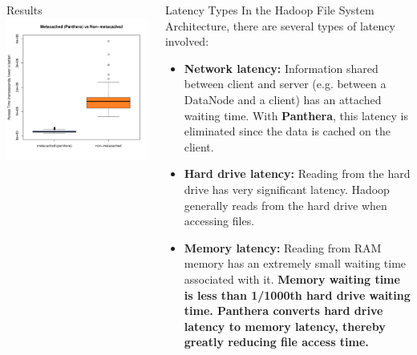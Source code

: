 \documentclass[final]{beamer} %
\begin{document}
\begin{frame}
\begin{columns}[t]
\begin{column}{0.32\textwidth}
\begin{block}{Results}
		\vspace{1em}
		\includegraphics[scale=1.2]{assets/box-plot-meta-multinode.pdf}
	\end{block}

	  
      \end{column}
      
      
      \begin{column}{0.32\textwidth}
      
	  \begin{block}{Latency Types}
		In the Hadoop File System Architecture, there are several types of latency involved:
		\begin{itemize}
		\item \textbf{Network latency: } Information shared between client and server (e.g. between a DataNode and a client) has an attached waiting time. With \textbf{Panthera}, this latency is eliminated since the data is cached on the client.
		\item \textbf{Hard drive latency: } Reading from the hard drive has very significant latency. Hadoop generally reads from the hard drive when accessing files.
		\item \textbf{Memory latency: } Reading from RAM memory has an extremely small
		waiting time associated with it. \textbf{Memory waiting time is less than 1/1000th hard drive waiting time. Panthera converts hard drive latency to memory latency, thereby greatly reducing file access time.}
		\end{itemize}
	  \end{block}
	  

\end{column}
\end{columns}
\end{frame}
\end{document}

